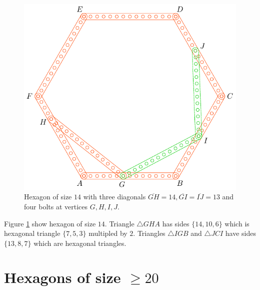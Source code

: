 \documentclass[11pt]{article}
\begin{document}
\begin{figure}[H]
\centering
\includegraphics[scale=1]{14/hexa-14a}
\caption{Hexagon of size $14$ with three diagonals $\overline{GH} = 14, \overline{GI} = \overline{IJ} = 13$ and four bolts at vertices $G,H,I,J$.}
\label{fig:14a}
\end{figure}

Figure \ref{fig:14a} show hexagon of size $14$. Triangle $\triangle{GHA}$ has sides $\{14,10,6\}$ which is hexagonal triangle $\{7,5,3\}$ multipled by $2$. Triangles $\triangle{IGB}$ and $\triangle{JCI}$ have sides $\{13,8,7\}$ which are hexagonal triangles.

\section{Hexagons of size $\ge 20$}
\end{document}
